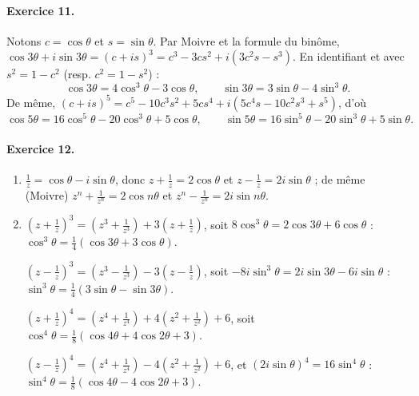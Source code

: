 \begin{corrige}
\paragraph{Exercice 11.}
Notons $c = \cos\theta$ et $s = \sin\theta$. Par Moivre et la formule du bin\^ome,
$\cos 3\theta + i\sin 3\theta = (c + is)^3 = c^3 - 3cs^2 + i(3c^2s - s^3)$. En identifiant et avec $s^2 = 1 - c^2$ (resp. $c^2 = 1 - s^2$) :
\[
\cos 3\theta = 4\cos^3\theta - 3\cos\theta , \qquad \sin 3\theta = 3\sin\theta - 4\sin^3\theta .
\]
De m\^eme, $(c + is)^5 = c^5 - 10c^3s^2 + 5cs^4 + i(5c^4s - 10c^2s^3 + s^5)$, d'o\`u
\[
\cos 5\theta = 16\cos^5\theta - 20\cos^3\theta + 5\cos\theta , \qquad \sin 5\theta = 16\sin^5\theta - 20\sin^3\theta + 5\sin\theta .
\]

\paragraph{Exercice 12.}
\begin{enumerate}
\item $\frac{1}{z} = \cos\theta - i\sin\theta$, donc $z + \frac{1}{z} = 2\cos\theta$ et $z - \frac{1}{z} = 2i\sin\theta$ ;
      de m\^eme (Moivre) $z^n + \frac{1}{z^n} = 2\cos n\theta$ et $z^n - \frac{1}{z^n} = 2i\sin n\theta$.
\item $\left(z + \frac{1}{z}\right)^3 = \left(z^3 + \frac{1}{z^3}\right) + 3\left(z + \frac{1}{z}\right)$, soit $8\cos^3\theta = 2\cos 3\theta + 6\cos\theta$ :
      $\cos^3\theta = \frac{1}{4}(\cos 3\theta + 3\cos\theta)$.

      $\left(z - \frac{1}{z}\right)^3 = \left(z^3 - \frac{1}{z^3}\right) - 3\left(z - \frac{1}{z}\right)$, soit $-8i\sin^3\theta = 2i\sin 3\theta - 6i\sin\theta$ :
      $\sin^3\theta = \frac{1}{4}(3\sin\theta - \sin 3\theta)$.

      $\left(z + \frac{1}{z}\right)^4 = \left(z^4 + \frac{1}{z^4}\right) + 4\left(z^2 + \frac{1}{z^2}\right) + 6$, soit
      $\cos^4\theta = \frac{1}{8}(\cos 4\theta + 4\cos 2\theta + 3)$.

      $\left(z - \frac{1}{z}\right)^4 = \left(z^4 + \frac{1}{z^4}\right) - 4\left(z^2 + \frac{1}{z^2}\right) + 6$, et $(2i\sin\theta)^4 = 16\sin^4\theta$ :
      $\sin^4\theta = \frac{1}{8}(\cos 4\theta - 4\cos 2\theta + 3)$.
\end{enumerate}


\end{corrige}
